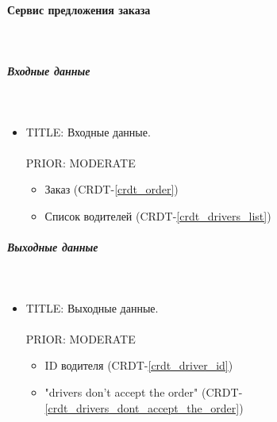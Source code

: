 \paragraph{Сервис предложения заказа} \mbox{} \\ \label{}

    \subparagraph{Входные данные} \mbox{} \\ \label{}

      \begin{itemize}

        \item{

          TITLE: Входные данные.\\
          \\
          PRIOR: MODERATE\\

        }

        \begin{itemize}
          \item Заказ (CRDT-\ref{crdt_order})
          \item Список водителей (CRDT-\ref{crdt_drivers_list})
        \end{itemize}

      \end{itemize}

    \subparagraph{Выходные данные} \mbox{} \\

      \begin{itemize}

        \item{

          TITLE: Выходные данные.\\
          \\
          PRIOR: MODERATE\\

        }

        \begin{itemize}
          \item ID водителя (CRDT-\ref{crdt_driver_id})
          \item "drivers don't accept the order" (CRDT-\ref{crdt_drivers_dont_accept_the_order})
        \end{itemize}

      \end{itemize}

